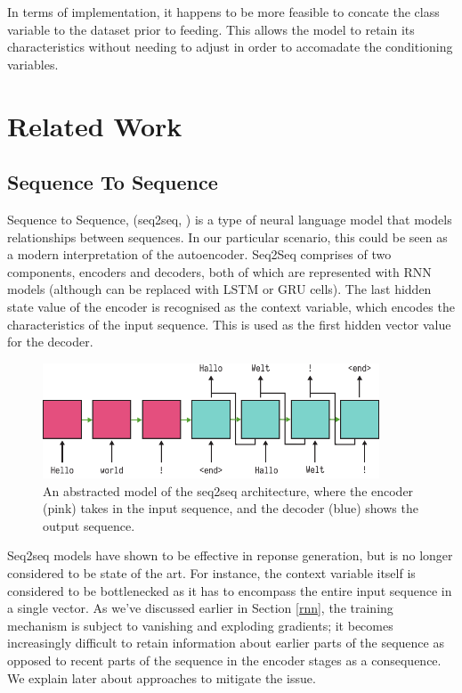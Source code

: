 \documentclass[12pt,twoside]{report}
\begin{document}
In terms of implementation, it happens to be more feasible to concate the class variable to the dataset prior to feeding. This allows the model to retain its characteristics without needing to adjust in order to accomadate the conditioning variables.


\section{Related Work}

\subsection{Sequence To Sequence}

Sequence to Sequence, (seq2seq, \cite{sutskever_sequence_2014}) is a type of neural language model that models relationships between sequences. In our particular scenario, this could be seen as a modern interpretation of the autoencoder. Seq2Seq comprises of two components, encoders and decoders, both of which are represented with RNN models (although can be replaced with LSTM or GRU cells). The last hidden state value of the encoder is recognised as the context variable, which encodes the characteristics of the input sequence. This is used as the first hidden vector value for the decoder. 

\begin{figure}[!ht]
		
\centering
\includegraphics[width=100mm]{diagrams/seq2seq.pdf}
\caption{An abstracted model of the seq2seq architecture, where the encoder (pink) takes in the input sequence, and the decoder (blue) shows the output sequence.\label{seq2seq}}
\end{figure}

Seq2seq models have shown to be effective in reponse generation, but is no longer considered to be state of the art. For instance, the context variable itself is considered to be bottlenecked as it has to encompass the entire input sequence in a single vector. As we've discussed earlier in Section \ref{rnn}, the training mechanism is subject to vanishing and exploding gradients; it becomes increasingly difficult to retain information about earlier parts of the sequence as opposed to recent parts of the sequence in the encoder stages as a consequence. We explain later about approaches to mitigate the issue.
\end{document}
